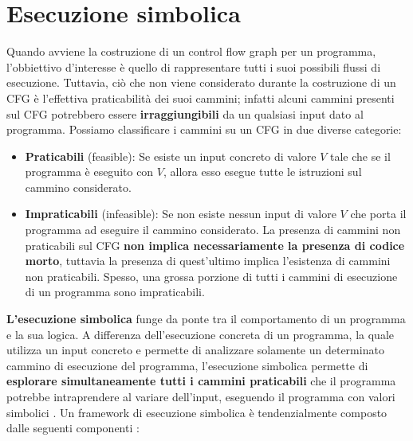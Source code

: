 \documentclass[../main.tex]{subfiles}
\begin{document}
\section{Esecuzione simbolica}
Quando avviene la costruzione di un control flow graph per un programma, l'obbiettivo d'interesse è quello di rappresentare tutti i suoi possibili flussi di esecuzione.
Tuttavia, ciò che non viene considerato durante la costruzione di un CFG è l'effettiva praticabilità dei suoi cammini; infatti alcuni cammini presenti sul CFG potrebbero
essere \textbf{irraggiungibili} da un qualsiasi input dato al programma. Possiamo classificare i cammini su un CFG in due diverse categorie:
\begin{itemize}
    \item \textbf{Praticabili} (feasible): Se esiste un input concreto di valore $V$ tale che se il programma è eseguito con $V$, allora esso esegue tutte le istruzioni sul cammino considerato.
    \item \textbf{Impraticabili} (infeasible): Se non esiste nessun input di valore $V$ che porta il programma ad eseguire il cammino considerato. La presenza di cammini non praticabili sul CFG \textbf{non implica necessariamente la presenza di codice morto}, tuttavia la presenza di quest'ultimo implica l'esistenza di cammini non praticabili.
    Spesso, una grossa porzione di tutti i cammini di esecuzione di un programma sono impraticabili.
\end{itemize}
\textbf{L'esecuzione simbolica} funge da ponte tra il comportamento di un programma e la sua logica. 
A differenza dell'esecuzione concreta di un programma, la quale utilizza un input concreto e permette di analizzare solamente un determinato cammino di esecuzione del programma,
l'esecuzione simbolica permette di \textbf{esplorare simultaneamente tutti i cammini praticabili} che il programma potrebbe intraprendere al variare dell'input, eseguendo il programma con valori simbolici \cite{Symbolic_exc_1}.
Un framework di esecuzione simbolica è tendenzialmente composto dalle seguenti componenti \cite{Symbolic_exc_1}:
\end{document}
